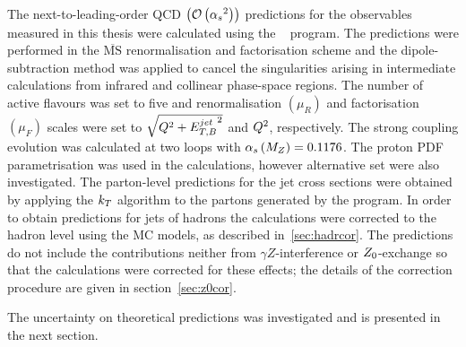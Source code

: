 The next-to-leading-order QCD $ \left( \mathcal{O}\left( \mbox{$\alpha_{s}$}^2\right) \right) $ predictions for the observables measured in this thesis were calculated using the \nlojet~\cite{nlojet++} program. The predictions were performed in the $\overline{\text{MS}}$ renormalisation and factorisation scheme and the dipole-subtraction method was applied to cancel the singularities arising in intermediate calculations from infrared and collinear phase-space regions. The number of active flavours was set to five and renormalisation $\left( \mu_R \right) $ and factorisation $\left( \mu_F \right) $ scales were set to $\sqrt{Q^2+\mbox{$E_{T,B}^{jet}$}^2}$ and $\mbox{${Q^2}$}$, respectively. The strong coupling evolution was calculated at two loops with $\mbox{$\alpha_{s}\left(M_{Z}\right)$}=0.1176$. The  proton PDF parametrisation was used in the calculations, however alternative set were also investigated. The parton-level predictions for the jet cross sections were obtained by applying the $\mbox{$k_{T}$}$ algorithm to the partons generated by the program. In order to obtain predictions for jets of hadrons the calculations were corrected to the hadron level using the MC models, as described in~\ref{sec:hadrcor}. The predictions do not include the contributions neither from $\gamma Z$-interference or $\mbox{$Z_0$}$-exchange so that the calculations were corrected for these effects; the details of the correction procedure are given in section~\ref{sec:z0cor}. 

The uncertainty on theoretical predictions was investigated and is presented in the next section.
